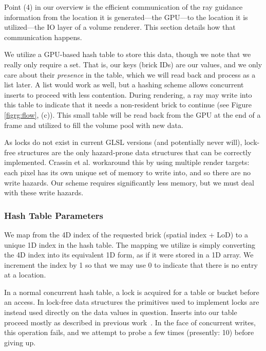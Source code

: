 Point (4) in our overview is the efficient communication of the ray
guidance information from the location it is generated---the GPU---to
the location it is utilized---the IO layer of a volume renderer.  This
section details how that communication happens.

We utilize a GPU-based hash table to store this data, though we note
that we really only require a set.  That is, our keys (brick IDs) are
our values, and we only care about their \emph{presence} in the table,
which we will read back and process as a list later.  A list would work
as well, but a hashing scheme allows concurrent inserts to proceed with
less contention.  During rendering, a ray may write into this table to
indicate that it
needs a non-resident brick to continue (see Figure \ref{figrg:flow},
(c)).  This small table will be read back from the GPU at the end of a
frame and utilized to fill the volume pool with new data.

As locks do not exist in current GLSL versions (and potentially never
will), lock-free structures are the only hazard-prone data structures
that can be correctly implemented.  Crassin et
al.\cite{Crassin:2009:Gigavoxels} workaround this by using multiple
render targets: each pixel has its own unique set of memory to
write into, and so there are no write hazards.  Our scheme requires
significantly less memory, but we must deal with these write hazards.

\subsubsection{Hash Table Parameters}
\label{sec:ht-params}

We map from the 4D index of the requested brick (spatial index + LoD)
to a unique 1D index in the hash table.  The mapping we utilize is
simply converting the 4D index into its equivalent 1D form, as if it
were stored in a 1D array.  We increment the index by 1 so that we may
use 0 to indicate that there is no entry at a location.

In a normal concurrent hash table, a lock is acquired for a table or
bucket before an access.  In lock-free data structures the primitives
used to implement locks are instead used directly on the data values
in question.  Inserts into our table proceed mostly as described in
previous
work~\cite{Michael:2002:LockFreeHT}.  In the face of concurrent
writes, this operation fails, and we attempt to probe a few times
(presently: 10) before giving up.


